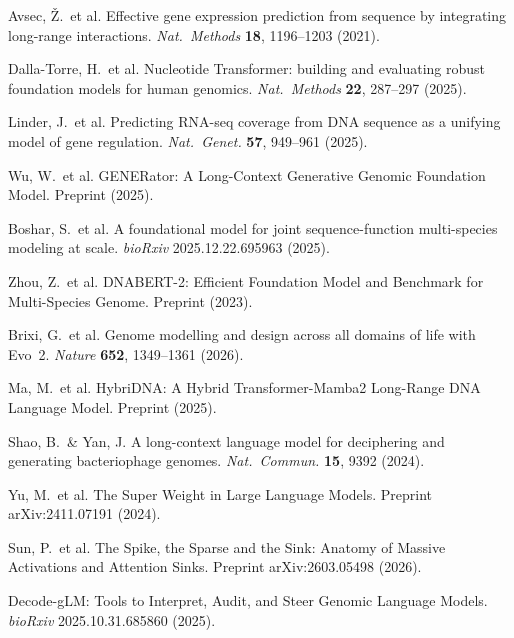 \documentclass[11pt]{article}
\begin{document}
\begin{enumerate}[leftmargin=*,label={[\arabic*]}]
\item Avsec, \v{Z}.\ et al. Effective gene expression prediction from
sequence by integrating long-range interactions.
\textit{Nat.\ Methods} \textbf{18}, 1196--1203 (2021).
\item Dalla-Torre, H.\ et al. Nucleotide Transformer: building and
evaluating robust foundation models for human genomics.
\textit{Nat.\ Methods} \textbf{22}, 287--297 (2025).
\item Linder, J.\ et al. Predicting RNA-seq coverage from DNA sequence
as a unifying model of gene regulation. \textit{Nat.\ Genet.}
\textbf{57}, 949--961 (2025).
\item Wu, W.\ et al. GENERator: A Long-Context Generative Genomic
Foundation Model. Preprint (2025).
\item Boshar, S.\ et al. A foundational model for joint
sequence-function multi-species modeling at scale. \textit{bioRxiv}
2025.12.22.695963 (2025).
\item Zhou, Z.\ et al. DNABERT-2: Efficient Foundation Model and
Benchmark for Multi-Species Genome. Preprint (2023).
\item Brixi, G.\ et al. Genome modelling and design across all domains
of life with Evo~2. \textit{Nature} \textbf{652}, 1349--1361 (2026).
\item Ma, M.\ et al. HybriDNA: A Hybrid Transformer-Mamba2 Long-Range
DNA Language Model. Preprint (2025).
\item Shao, B.\ \& Yan, J. A long-context language model for deciphering
and generating bacteriophage genomes. \textit{Nat.\ Commun.}
\textbf{15}, 9392 (2024).
\item Yu, M.\ et al. The Super Weight in Large Language Models. Preprint
arXiv:2411.07191 (2024).
\item Sun, P.\ et al. The Spike, the Sparse and the Sink: Anatomy of
Massive Activations and Attention Sinks. Preprint arXiv:2603.05498
(2026).
\item Decode-gLM: Tools to Interpret, Audit, and Steer Genomic Language
Models. \textit{bioRxiv} 2025.10.31.685860 (2025).
\end{enumerate}
\end{document}

